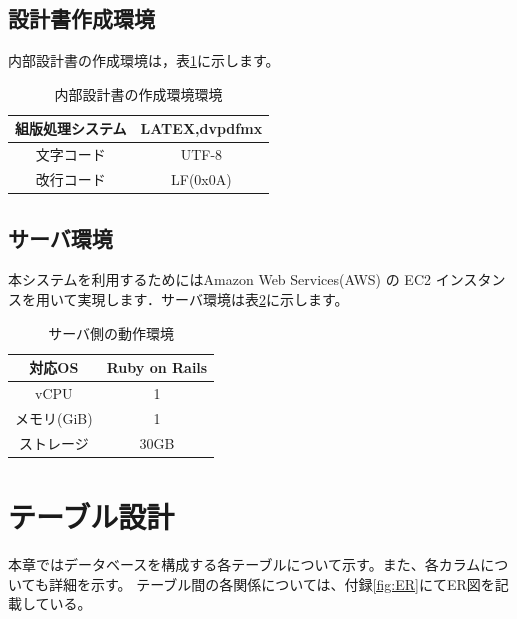 \documentclass[a4j]{jarticle}
\begin{document}
\subsection{設計書作成環境}
内部設計書の作成環境は，表\ref{tab:creating_environment}に示します。
\begin{table}[htb]
\caption{内部設計書の作成環境環境}
\begin{center}
  \begin{tabular}{|c|c|} \hline
    組版処理システム & LATEX,dvpdfmx\\ \hline
   文字コード &  UTF-8\\ \hline
    改行コード & LF(0x0A)  \\ \hline
  \end{tabular}
\label{tab:creating_environment}
\end{center}
\end{table}
\subsection{サーバ環境}
本システムを利用するためにはAmazon Web Services(AWS) の EC2 インスタンスを用いて実現します．サーバ環境は表\ref{tab:server_environment}に示します。
\begin{table}[H]
\caption{サーバ側の動作環境}
\begin{center}
  \begin{tabular}{|c|c|} \hline
    対応OS & Ruby on Rails \\ \hline
   vCPU & 1\\ \hline
    メモリ(GiB) & 1  \\ \hline
    ストレージ & 30GB \\ \hline
  \end{tabular}
\label{tab:server_environment}
\end{center}
\end{table}
\section{テーブル設計}
本章ではデータベースを構成する各テーブルについて示す。また、各カラムについても詳細を示す。
テーブル間の各関係については、付録\ref{fig:ER}にてER図を記載している。
\end{document}

